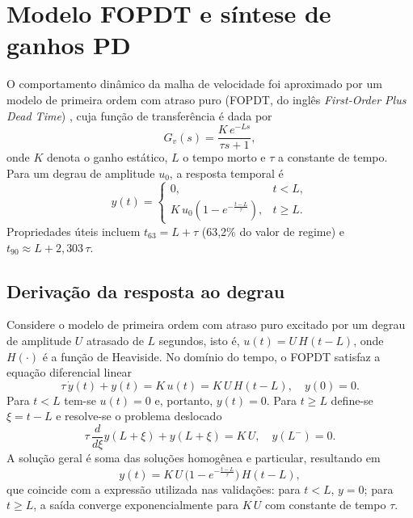 \section{Modelo FOPDT e síntese de ganhos PD}\label{sec:fopdt_pd}

O comportamento dinâmico da malha de velocidade foi aproximado por um
modelo de primeira ordem com atraso puro (FOPDT, do inglês
\emph{First-Order Plus Dead Time}) \cite{astrom1995}, cuja função de transferência é dada por
\begin{equation}
    G_v(s) = \frac{K\,e^{-Ls}}{\tau s + 1},
\end{equation}
onde $K$ denota o ganho estático, $L$ o tempo morto e $\tau$ a constante
de tempo. Para um degrau de amplitude $u_0$, a resposta temporal é
\begin{equation}
    y(t) = \begin{cases}
        0, & t < L, \\
        K\,u_0\left(1 - e^{-\frac{t-L}{\tau}}\right), & t \ge L.
    \end{cases}
\end{equation}
Propriedades úteis incluem $t_{63}=L+\tau$ (63,2\% do valor de regime) e
$t_{90}\approx L+2{,}303\,\tau$.

\subsection{Derivação da resposta ao degrau}\label{subsec:fopdt_degrau}
Considere o modelo de primeira ordem com atraso puro excitado por um
degrau de amplitude $U$ atrasado de $L$ segundos, isto é,
\(u(t) = U\,H(t-L)\), onde $H(\cdot)$ é a função de Heaviside. No
domínio do tempo, o FOPDT satisfaz a equação diferencial linear
\begin{equation}
    \tau\,\dot y(t) + y(t) = K\,u(t) = K\,U\,H(t-L), \quad y(0)=0.
\end{equation}
Para $t<L$ tem-se $u(t)=0$ e, portanto, $y(t)=0$. Para $t\ge L$ define-se
\(\xi = t-L\) e resolve-se o problema deslocado
\begin{equation}
    \tau\,\frac{d}{d\xi} y(L+\xi) + y(L+\xi) = K\,U, \quad y(L^-)=0.
\end{equation}
A solução geral é soma das soluções homogênea e particular, resultando em
\begin{equation}
    y(t) = K\,U\,\bigl(1 - e^{-\frac{t-L}{\tau}}\bigr)\,H(t-L),
\end{equation}
que coincide com a expressão utilizada nas validações: para $t<L$, $y=0$;
para $t\ge L$, a saída converge exponencialmente para $K\,U$ com
constante de tempo $\tau$.

